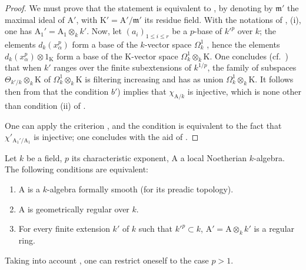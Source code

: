 \begin{proof}
We must prove that the statement is equivalent to , by denoting by $\mathfrak{m}'$ the maximal ideal of $\mathrm{A}'$, with $\mathrm{K}'=\mathrm{A}'/\mathfrak{m}'$ its residue field.
With the notations of , (i), one has $\mathrm{A}_1'=\mathrm{A}_1\otimes_kk'$.
Now, let $(a_i)_{1\leq i\leq r}$ be a $p$-base of $k'^p$ over $k$; the elements $d_k(x_\alpha^p)$ form a base of the $k$-vector space $\Omega^1_k$ , hence the elements $d_k(x_\alpha^p)\otimes 1_\mathrm{K}$ form a base of the $\mathrm{K}$-vector space $\Omega^1_k\otimes_k\mathrm{K}$.
One concludes (cf.~) that when $k'$ ranges over the finite subextensions of $k^{1/p}$, the family of subspaces $\Theta_{k'/k}\otimes_k\mathrm{K}$ of $\Omega^1_k\otimes_k\mathrm{K}$ is filtering increasing and has as union $\Omega^1_k\otimes_k\mathrm{K}$.
It follows then from  that the condition $b'$) implies that $\chi_{\mathrm{A}/k}$ is injective, which is none other than condition (ii) of .

One can apply the criterion , and the condition is equivalent to the fact that $\chi'_{\mathrm{A}_1'/\mathrm{A}_1}$ is injective; one concludes with the aid of .
\end{proof}

\begin{theorem}[22.5.8]
\label{0.22.5.8}
Let $k$ be a field, $p$ its characteristic exponent, $\mathrm{A}$ a local Noetherian $k$-algebra.
The following conditions are equivalent:
\begin{enumerate}
  \item[a)] $\mathrm{A}$ is a $k$-algebra formally smooth (for its preadic topology).
  \item[b)] $\mathrm{A}$ is geometrically regular over $k$.
  \item[b')] For every finite extension $k'$ of $k$ such that $k'^p\subset k$, $\mathrm{A}'=\mathrm{A}\otimes_kk'$ is a regular ring.
\end{enumerate}
Taking into account , one can restrict oneself to the case $p>1$.
\end{theorem}

